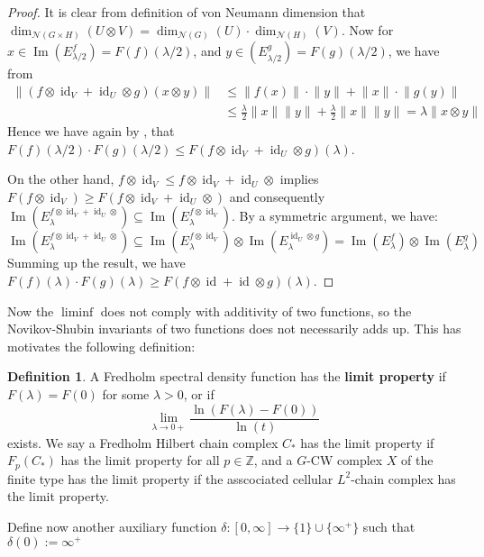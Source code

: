 \documentclass[11pt]{report}
\theoremstyle{definition}
\newtheorem{Def}{Definition}[chapter]
\theoremstyle{plain}
\DeclareMathOperator{\id}{id}
\DeclareMathOperator{\im}{Im}
\newcommand{\integer}{\mathbb{Z}}
\newcommand{\vna}{\mathcal{N}}
\newcommand{\norm}[1]{\lVert #1 \rVert}
\begin{document}
\begin{proof}
	It is clear from definition of von Neumann dimension that $\dim_{\vna(G\times H)}(U\otimes V)=\dim_{\vna(G)}(U)\cdot \dim_{\vna(H)}(V)$. Now for $x\in \im(E^f_{\lambda/2})=F(f)(\lambda/2)$, and $y\in (E^g_{\lambda/2})=F(g)(\lambda/2)$, we have from 
	\begin{equation*}
	\begin{split}
	\norm{(f\otimes \id_V+\id_U\otimes g)(x\otimes y)}&\leq \norm{f(x)}\cdot \norm{y}+\norm{x}\cdot \norm{g(y)}\\
	&\leq \frac{\lambda}{2}\norm{x}\norm{y}+\frac{\lambda}{2}\norm{x}\norm{y}=\lambda\norm{x\otimes y}
	\end{split}
	\end{equation*}
	Hence we have again by , that $F(f)(\lambda/2)\cdot F(g)(\lambda/2)\leq F(f\otimes \id_V+\id_U\otimes g)(\lambda)$. 
	\par On the other hand, $f\otimes \id_V\leq f\otimes \id_V+\id_U\otimes $ implies $F(f\otimes\id_V)\geq F(f\otimes \id_V+\id_U\otimes)$ and consequently $\im(E_\lambda^{f\otimes \id_V+\id_U\otimes })\subseteq \im(E_\lambda^{f\otimes \id_V})$. By a symmetric argument, we have:
	\begin{equation*}
	\im(E_\lambda^{f\otimes \id_V+\id_U\otimes })\subseteq \im(E_\lambda^{f\otimes \id_V})\otimes \im(E_\lambda^{\id_U\otimes g})=\im(E_\lambda^f)\otimes \im(E_\lambda^g)
	\end{equation*}
	Summing up the result, we have $F(f)(\lambda)\cdot F(g)(\lambda)\geq F(f\otimes \id+\id\otimes g)(\lambda)$.
\end{proof} 
Now the $\liminf$ does not comply with additivity of two functions, so the Novikov-Shubin invariants of two functions does not necessarily adds up. This has motivates the following definition:
\begin{Def}
	A Fredholm spectral density function has the \textbf{limit property} if $F(\lambda)=F(0)$ for some $\lambda>0$, or if
	\begin{equation}
	\lim_{\lambda\to 0+}\frac{\ln(F(\lambda)-F(0))}{\ln(t)}
	\end{equation}
	exists. We say a Fredholm Hilbert chain complex $C_*$ has the limit property if $F_p(C_*)$ has the limit property for all $p\in \integer$, and a $G$-CW complex $X$ of the finite type has the limit property if the asscociated cellular $L^2$-chain complex has the limit property.
\end{Def}
Define now another auxiliary function $\delta:[0, \infty]\to \{1\}\cup \{\infty^+\}$ such that $\delta(0):=\infty^+ $
\end{document}
